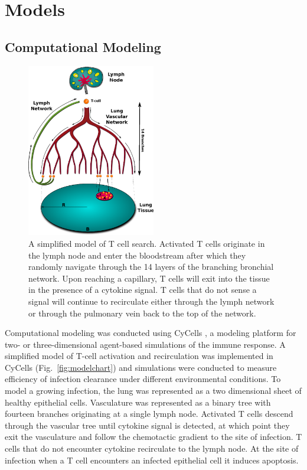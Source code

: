 \documentclass[10pt]{article}
\begin{document}
\section*{Models}


\subsection*{Computational Modeling}

\begin{figure}[ht!]
\begin{center}
\includegraphics[width=0.5\textwidth]{SystemChart}
\end{center}
\caption{A simplified model of T cell search.  Activated T cells originate in the lymph node and enter the bloodstream after which they randomly navigate through the 14 layers of the branching bronchial network.  Upon reaching a capillary, T cells will exit into the tissue in the presence of a cytokine signal.  T cells that do not sense a signal will continue to recirculate either through the lymph network or through the pulmonary vein back to the top of the network.}
\label{fig:systemchart}
\end{figure}

Computational modeling was conducted using CyCells \cite{Warrender2006}, a modeling platform for two- or three-dimensional agent-based simulations of the immune response. A simplified model of T-cell activation and recirculation was implemented in CyCells (Fig.~\ref{fig:modelchart}) and simulations were conducted to measure efficiency of infection clearance under different environmental conditions. To model a growing infection, the lung was represented as a two dimensional sheet of healthy epithelial cells. Vasculature was represented as a binary tree with fourteen branches originating at a single lymph node. Activated T cells descend through the vascular tree until cytokine signal is detected, at which point they exit the vasculature and follow the chemotactic gradient to the site of infection. T cells that do not encounter cytokine recirculate to the lymph node. At the site of infection when a T cell encounters an infected epithelial cell it induces apoptosis.
\end{document}
